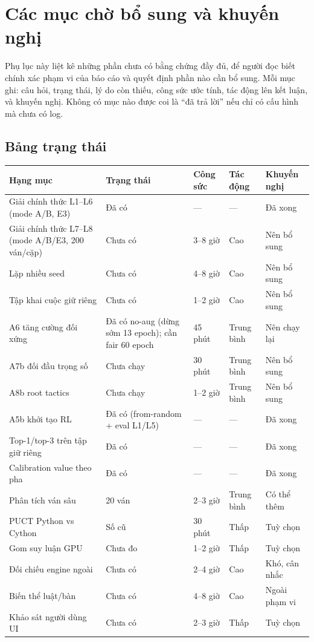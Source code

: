 \chapter{Các mục chờ bổ sung và khuyến nghị}
\label{app:cho-bo-sung}

Phụ lục này liệt kê những phần chưa có bằng chứng đầy đủ, để người đọc biết chính xác phạm vi
của báo cáo và quyết định phần nào cần bổ sung. Mỗi mục ghi: câu hỏi, trạng thái, lý do còn
thiếu, công sức ước tính, tác động lên kết luận, và khuyến nghị. Không có mục nào được coi là
``đã trả lời'' nếu chỉ có cấu hình mà chưa có log.

\section{Bảng trạng thái}
\begin{small}
\begin{longtable}{@{}p{} p{} p{} p{} p{}@{}}
\toprule
\textbf{Hạng mục} & \textbf{Trạng thái} & \textbf{Công sức} & \textbf{Tác động} & \textbf{Khuyến nghị} \\
\midrule
Giải chính thức L1--L6 (mode A/B, E3) & Đã có & — & — & Đã xong \\
Giải chính thức L7--L8 (mode A/B/E3, 200 ván/cặp) & Chưa có & 3--8 giờ & Cao & Nên bổ sung \\
Lặp nhiều seed & Chưa có & 4--8 giờ & Cao & Nên bổ sung \\
Tập khai cuộc giữ riêng & Chưa có & 1--2 giờ & Cao & Nên bổ sung \\
A6 tăng cường đối xứng & Đã có no-aug (dừng sớm 13 epoch); cần fair 60 epoch & 45 phút & Trung bình & Nên chạy lại \\
A7b đối đầu trọng số & Chưa chạy & 30 phút & Trung bình & Nên bổ sung \\
A8b root tactics & Chưa chạy & 1--2 giờ & Trung bình & Nên bổ sung \\
A5b khởi tạo RL & Đã có (from-random + eval L1/L5) & — & — & Đã xong \\
Top-1/top-3 trên tập giữ riêng & Đã có & — & — & Đã xong \\
Calibration value theo pha & Đã có & — & — & Đã xong \\
Phân tích ván sâu & 20 ván & 2--3 giờ & Trung bình & Có thể thêm \\
PUCT Python vs Cython & Số cũ & 30 phút & Thấp & Tuỳ chọn \\
Gom suy luận GPU & Chưa đo & 1--2 giờ & Thấp & Tuỳ chọn \\
Đối chiếu engine ngoài & Chưa có & 2--4 giờ & Cao & Khó, cân nhắc \\
Biến thể luật/bàn & Chưa có & 4--8 giờ & Cao & Ngoài phạm vi \\
Khảo sát người dùng UI & Chưa có & 2--3 giờ & Thấp & Tuỳ chọn \\
\bottomrule
\end{longtable}
\end{small}

